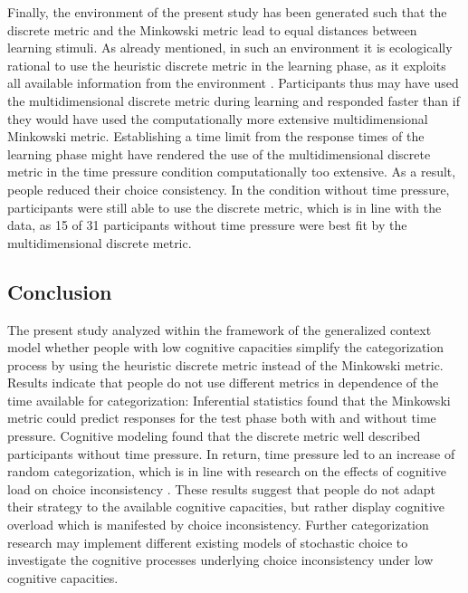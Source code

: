 \documentclass[a4paper,man,natbib]{apa6}
\begin{document}
Finally, the environment of the present study has been generated such that the discrete metric and the Minkowski metric lead to equal distances between learning stimuli. As already mentioned, in such an environment it is ecologically rational to use the heuristic discrete metric in the learning phase, as it exploits all available information from the environment \citep{todd2007environments}. Participants thus may have used the multidimensional discrete metric during learning and responded faster than if they would have used the computationally more extensive multidimensional Minkowski metric. Establishing a time limit from the response times of the learning phase might have rendered the use of the multidimensional discrete metric in the time pressure condition computationally too extensive. As a result, people reduced their choice consistency. In the condition without time pressure, participants were still able to use the discrete metric, which is in line with the data, as 15 of 31 participants without time pressure were best fit by the multidimensional discrete metric.

\subsection{Conclusion}
The present study analyzed within the framework of the generalized context model \citep{nosofsky1986attention} whether people with low cognitive capacities simplify the categorization process by using the heuristic discrete metric instead of the Minkowski metric. Results indicate that people do not use different metrics in dependence of the time available for categorization: Inferential statistics found that the Minkowski metric could predict responses for the test phase both with and without time pressure. Cognitive modeling found that the discrete metric well described participants without time pressure. In return, time pressure led to an increase of random categorization, which is in line with research on the effects of cognitive load on choice inconsistency \citep{olschewski2018taxing}. These results suggest that people do not adapt their strategy to the available cognitive capacities, but rather display cognitive overload which is manifested by choice inconsistency. Further categorization research may implement different existing models of stochastic choice \citep{blavatskyy2010models, becker1963stochastic} to investigate the cognitive processes underlying choice inconsistency under low cognitive capacities.


\end{document}
